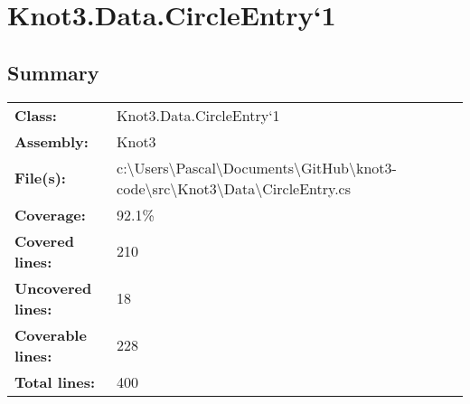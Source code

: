 \documentclass[a4paper,10pt]{article}
\begin{document}
\section{Knot3.Data.CircleEntry`1}
\subsection{Summary}
\begin{longtable}[l]{ll}
\textbf{Class:} & Knot3.Data.CircleEntry`1\\
\textbf{Assembly:} & Knot3\\
\textbf{File(s):} & \begin{minipage}[t]{12cm}{c:\textbackslash Users\textbackslash Pascal\textbackslash Documents\textbackslash GitHub\textbackslash knot3-code\textbackslash src\textbackslash Knot3\textbackslash Data\textbackslash CircleEntry.cs}\end{minipage} \\
\textbf{Coverage:} & 92.1\%\\
\textbf{Covered lines:} & 210\\
\textbf{Uncovered lines:} & 18\\
\textbf{Coverable lines:} & 228\\
\textbf{Total lines:} & 400\\
\end{longtable}
\end{document}
